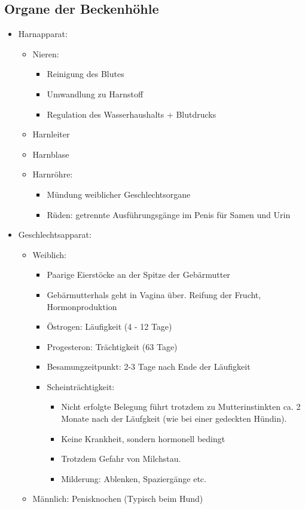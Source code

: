     \subsection{Organe der Beckenhöhle}
    \begin{itemize}
        \item Harnapparat:
        \begin{itemize}
            \item Nieren:
            \begin{itemize}
                \item Reinigung des Blutes
                \item Umwandlung zu Harnstoff
                \item Regulation des Wasserhaushalts + Blutdrucks
            \end{itemize}
            \item Harnleiter
            \item Harnblase
            \item Harnröhre:
            \begin{itemize}
                \item Mündung weiblicher Geschlechtsorgane
                \item Rüden: getrennte Ausführungsgänge im Penis für Samen und Urin
            \end{itemize}
        \end{itemize}
        \item Geschlechtsapparat:
        \begin{itemize}
            \item Weiblich:
            \begin{itemize}
                \item Paarige Eierstöcke an der Spitze der Gebärmutter
                \item Gebärmutterhals geht in Vagina über. Reifung der Frucht, Hormonproduktion
                \item Östrogen: Läufigkeit (4 - 12 Tage)
                \item Progesteron: Trächtigkeit (63 Tage)
                \item Besamungzeitpunkt: 2-3 Tage nach Ende der Läufigkeit
                \item Scheinträchtigkeit:
                \begin{itemize}
                    \item Nicht erfolgte Belegung führt trotzdem zu Mutterinstinkten ca. 2 Monate nach der Läufgkeit (wie bei einer gedeckten Hündin).
                    \item Keine Krankheit, sondern hormonell bedingt
                    \item Trotzdem Gefahr von Milchstau.
                    \item Milderung: Ablenken, Spaziergänge etc.
                \end{itemize}
            \end{itemize}
            \item Männlich: Penisknochen (Typisch beim Hund)
        \end{itemize}
    \end{itemize}

